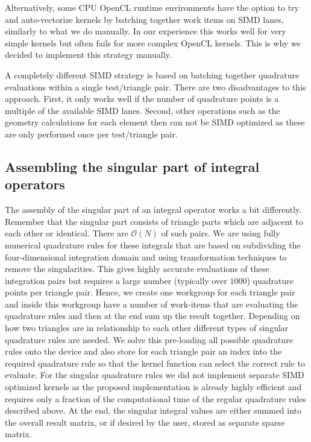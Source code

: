 Alternatively, some CPU OpenCL runtime environments have the option to try and auto-vectorize kernels by batching together work items on SIMD lanes, similarly to what we do manually. In our experience this works well for very simple kernels but often fails for more complex OpenCL kernels. This is why we decided to implement this strategy manually.

A completely different SIMD strategy is based on batching together quadrature evaluations within a single test/triangle pair. There are two disadvantages to this approach. First, it only works well if the number of quadrature points is a multiple of the available SIMD lanes. Second, other operations such as the geometry calculations for each element then can not be SIMD optimized as these are only performed once per test/triangle pair.


\subsection{Assembling the singular part of integral operators}

The assembly of the singular part of an integral operator works a bit differently. Remember that the singular part consists of triangle parts which are adjacent to each other or identical. There are $\mathcal{O}(N)$ of such pairs. We are using fully numerical quadrature rules for these integrals that are based on subdividing the four-dimensional integration domain and using transformation techniques to remove the singularities. This gives highly accurate evaluations of these integration pairs but requires a large number (typically over $1000$) quadrature points per triangle pair. Hence, we create one workgroup for each triangle pair and inside this workgroup have a number of work-items that are evaluating the quadrature rules and then at the end sum up the result together. Depending on how two triangles are in relationship to each other different types of singular quadrature rules are needed. We solve this pre-loading all possible quadrature rules onto the device and also store for each triangle pair an index into the required quadrature rule so that the kernel function can select the correct rule to evaluate. For the singular quadrature rules we did not implement separate SIMD optimized kernels as the proposed implementation is already highly efficient and requires only a fraction of the computational time of the regular quadrature rules described above. At the end, the singular integral values are either summed into the overall result matrix, or if desired by the user, stored as separate sparse matrix.


